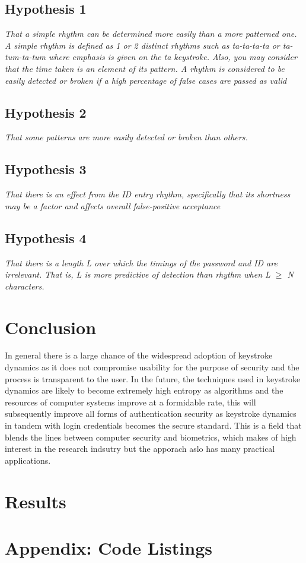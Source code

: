 \documentclass{article}
\begin{document}
\subsection{Hypothesis 1}
\begin{center}
\textit{ That a simple rhythm can be determined more easily than a more patterned one. A simple rhythm is defined as 1 or 2 distinct rhythms such as ta-ta-ta-ta or ta-tum-ta-tum where emphasis is given on the ta keystroke. Also, you may consider that the time taken is an element of its pattern. A rhythm is considered to be easily detected or broken if a high percentage of false cases are passed as valid}
\end{center}

\subsection{Hypothesis 2}
\begin{center}
\textit{That some patterns are more easily detected or broken than others.}
\end{center}

\subsection{Hypothesis 3}
\begin{center}
\textit{That there is an effect from the ID entry rhythm, specifically that its shortness may be a factor and affects overall false-positive acceptance}
\end{center}


\subsection{Hypothesis 4}
\begin{center}
\textit{That there is a length L over which the timings of the password and ID are
irrelevant. That is, L is more predictive of detection than rhythm when L $\geq$ N characters.}
\end{center}

\section{Conclusion}

In general there is a large chance of the widespread adoption of keystroke dynamics as it does not compromise usability for the purpose of security and the process is transparent to the user. In the future, the techniques used in keystroke dynamics are likely to become extremely high entropy as algorithms and the resources of computer systems improve at a formidable rate, this will subsequently improve all forms of authentication security as keystroke dynamics in tandem with login credentials becomes the secure standard. This is a field that blends the lines between computer security and biometrics, which makes of high interest in the research indsutry but the apporach aslo has many practical applications.  

\section{Results}

\section{Appendix: Code Listings} \label{appendix}

\medskip
\printbibliography
\end{document}
